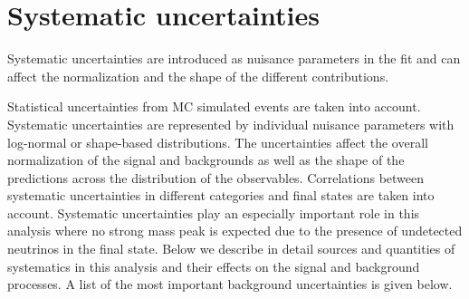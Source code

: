 \newpage

\section{Systematic uncertainties}\label{sec:systematics}
Systematic uncertainties are introduced as nuisance parameters in the fit and can affect the
normalization and the shape of the different contributions.

Statistical uncertainties from MC simulated events are taken into account.
Systematic uncertainties are represented by individual nuisance parameters with log-normal or
shape-based distributions. The uncertainties affect the overall normalization of the signal and
backgrounds as well as the shape of the predictions across the distribution of the observables.
Correlations between systematic uncertainties in different categories and final states are taken
into account. Systematic uncertainties play an especially important role in this analysis where
no strong mass peak is expected due to the presence of undetected neutrinos in the final state.
Below we describe in detail sources and quantities of systematics in this analysis and their
effects on the signal and background processes.
A list of the most important background uncertainties is given below.



